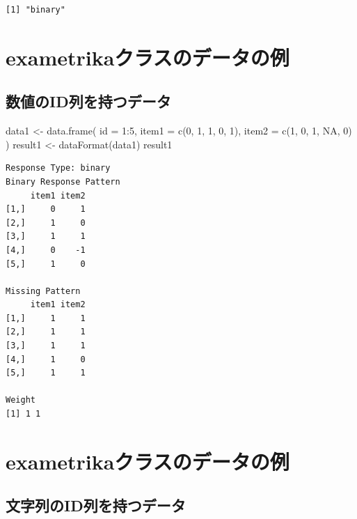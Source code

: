 \documentclass[
  a4paper,
]{ltjsbook}
\newenvironment{Shaded}{\begin{snugshade}}{\end{snugshade}}
\newcommand{\AttributeTok}[1]{\textcolor[rgb]{0.40,0.45,0.13}{#1}}
\newcommand{\ConstantTok}[1]{\textcolor[rgb]{0.56,0.35,0.01}{#1}}
\newcommand{\DecValTok}[1]{\textcolor[rgb]{0.68,0.00,0.00}{#1}}
\newcommand{\FunctionTok}[1]{\textcolor[rgb]{0.28,0.35,0.67}{#1}}
\newcommand{\NormalTok}[1]{\textcolor[rgb]{0.00,0.23,0.31}{#1}}
\newcommand{\OtherTok}[1]{\textcolor[rgb]{0.00,0.23,0.31}{#1}}
\newcommand{\SpecialCharTok}[1]{\textcolor[rgb]{0.37,0.37,0.37}{#1}}
\begin{document}
\begin{verbatim}
[1] "binary"
\end{verbatim}

\section{exametrikaクラスのデータの例}\label{exametrikaux30afux30e9ux30b9ux306eux30c7ux30fcux30bfux306eux4f8b}

\subsection{数値のID列を持つデータ}\label{ux6570ux5024ux306eidux5217ux3092ux6301ux3064ux30c7ux30fcux30bf}

\begin{Shaded}
\begin{Highlighting}[]
\NormalTok{data1 }\OtherTok{\textless{}{-}} \FunctionTok{data.frame}\NormalTok{(}
    \AttributeTok{id =} \DecValTok{1}\SpecialCharTok{:}\DecValTok{5}\NormalTok{,}
    \AttributeTok{item1 =} \FunctionTok{c}\NormalTok{(}\DecValTok{0}\NormalTok{, }\DecValTok{1}\NormalTok{, }\DecValTok{1}\NormalTok{, }\DecValTok{0}\NormalTok{, }\DecValTok{1}\NormalTok{),}
    \AttributeTok{item2 =} \FunctionTok{c}\NormalTok{(}\DecValTok{1}\NormalTok{, }\DecValTok{0}\NormalTok{, }\DecValTok{1}\NormalTok{, }\ConstantTok{NA}\NormalTok{, }\DecValTok{0}\NormalTok{)}
\NormalTok{)}
\NormalTok{result1 }\OtherTok{\textless{}{-}} \FunctionTok{dataFormat}\NormalTok{(data1)}
\NormalTok{result1}
\end{Highlighting}
\end{Shaded}

\begin{verbatim}
Response Type: binary 
Binary Response Pattern
     item1 item2
[1,]     0     1
[2,]     1     0
[3,]     1     1
[4,]     0    -1
[5,]     1     0

Missing Pattern
     item1 item2
[1,]     1     1
[2,]     1     1
[3,]     1     1
[4,]     1     0
[5,]     1     1

Weight
[1] 1 1
\end{verbatim}

\section{exametrikaクラスのデータの例}\label{exametrikaux30afux30e9ux30b9ux306eux30c7ux30fcux30bfux306eux4f8b-1}

\subsection{文字列のID列を持つデータ}\label{ux6587ux5b57ux5217ux306eidux5217ux3092ux6301ux3064ux30c7ux30fcux30bf}
\end{document}
